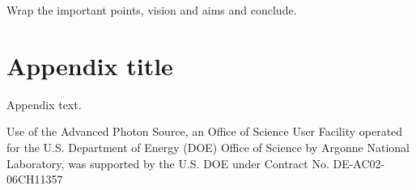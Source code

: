 \documentclass[pdf]{iucr}              %
\begin{document}
Wrap the important points, vision and aims and conclude.

\appendix
\section{Appendix title}

Appendix text.



Use of the Advanced Photon Source, an Office of Science User Facility operated for the U.S. Department of Energy (DOE) Office of Science by Argonne National Laboratory, was supported by the U.S. DOE under Contract No. DE-AC02-06CH11357





 
\end{document}
